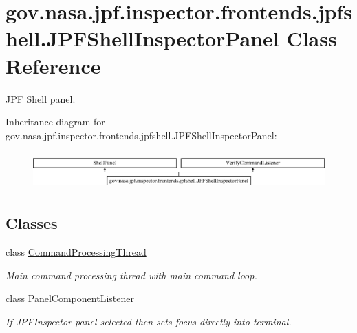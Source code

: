\hypertarget{classgov_1_1nasa_1_1jpf_1_1inspector_1_1frontends_1_1jpfshell_1_1_j_p_f_shell_inspector_panel}{}\section{gov.\+nasa.\+jpf.\+inspector.\+frontends.\+jpfshell.\+J\+P\+F\+Shell\+Inspector\+Panel Class Reference}
\label{classgov_1_1nasa_1_1jpf_1_1inspector_1_1frontends_1_1jpfshell_1_1_j_p_f_shell_inspector_panel}


J\+PF Shell panel.  


Inheritance diagram for gov.\+nasa.\+jpf.\+inspector.\+frontends.\+jpfshell.\+J\+P\+F\+Shell\+Inspector\+Panel\+:\begin{figure}[H]
\begin{center}
\leavevmode
\includegraphics[height=1.450777cm]{classgov_1_1nasa_1_1jpf_1_1inspector_1_1frontends_1_1jpfshell_1_1_j_p_f_shell_inspector_panel}
\end{center}
\end{figure}
\subsection*{Classes}
\begin{DoxyCompactItemize}
\item 
class \hyperlink{classgov_1_1nasa_1_1jpf_1_1inspector_1_1frontends_1_1jpfshell_1_1_j_p_f_shell_inspector_panel_1_1_command_processing_thread}{Command\+Processing\+Thread}
\begin{DoxyCompactList}\small\item\em Main command processing thread with main command loop. \end{DoxyCompactList}\item 
class \hyperlink{classgov_1_1nasa_1_1jpf_1_1inspector_1_1frontends_1_1jpfshell_1_1_j_p_f_shell_inspector_panel_1_1_panel_component_listener}{Panel\+Component\+Listener}
\begin{DoxyCompactList}\small\item\em If J\+P\+F\+Inspector panel selected then sets focus directly into terminal. \end{DoxyCompactList}\end{DoxyCompactItemize}
